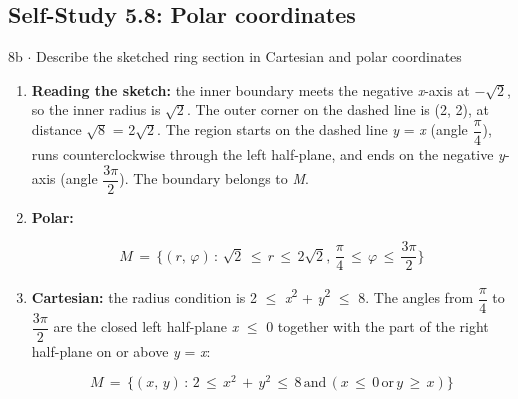 \documentclass[11pt]{article}
\begin{document}
\begin{keepsection}\subsection{Self-Study 5.8: Polar coordinates}

\begin{workedbox}{8b \ensuremath{\cdot} Describe the sketched ring section in Cartesian and polar coordinates}
\begin{enumerate}
\item \textbf{Reading the sketch:} the inner boundary meets the negative \textit{x}-axis at \ensuremath{-}\ensuremath{\sqrt{2}}, so the inner radius is \ensuremath{\sqrt{2}}. The outer corner on the dashed line is (2, 2), at distance \ensuremath{\sqrt{8}} = 2\ensuremath{\sqrt{2}}. The region starts on the dashed line \textit{y} = \textit{x} (angle {\small\ensuremath{\dfrac{π}{4}}}), runs counterclockwise through the left half-plane, and ends on the negative \textit{y}-axis (angle {\small\ensuremath{\dfrac{3π}{2}}}). The boundary belongs to \textit{M}.
\item {}
\textbf{Polar:}

\begin{equation*}{M}\, =\, \{({r},\, φ)\, :\, \sqrt{2}\, \leq \, {r}\, \leq \, 2\sqrt{2},\, \dfrac{π}{4}\, \leq \, φ\, \leq \, \dfrac{3π}{2}\}\end{equation*}
\item {}
\textbf{Cartesian:} the radius condition is 2 \ensuremath{\leq} \textit{x}\textsuperscript{2} + \textit{y}\textsuperscript{2} \ensuremath{\leq} 8. The angles from {\small\ensuremath{\dfrac{π}{4}}} to {\small\ensuremath{\dfrac{3π}{2}}} are the closed left half-plane \textit{x} \ensuremath{\leq} 0 together with the part of the right half-plane on or above \textit{y} = \textit{x}:

\begin{equation*}{M}\, =\, \{({x},\, {y})\, :\, 2\, \leq \, {x}^{2}\, +\, {y}^{2}\, \leq \, 8\, \text{and}\, ({x}\, \leq \, 0\, \text{or}\, {y}\, \geq \, {x})\}\end{equation*}


\end{enumerate}
\end{workedbox}
\end{keepsection}
\end{document}
